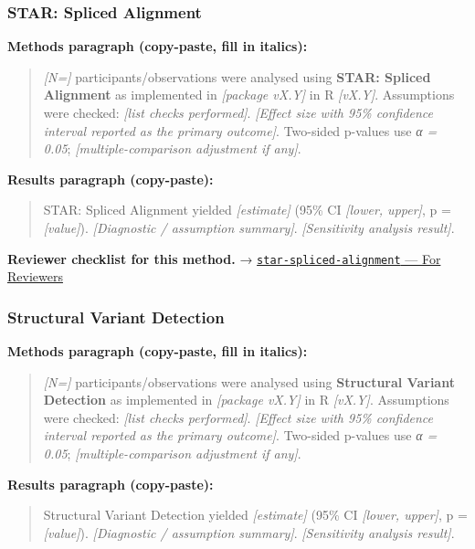 \documentclass[
]{article}
\begin{document}
\subsubsection{STAR: Spliced Alignment}\label{star-spliced-alignment}

\textbf{Methods paragraph (copy-paste, fill in italics):}

\begin{quote}
\emph{{[}N={]}} participants/observations were analysed using
\textbf{STAR: Spliced Alignment} as implemented in \emph{{[}package
vX.Y{]}} in R \emph{{[}vX.Y{]}}. Assumptions were checked: \emph{{[}list
checks performed{]}}. \emph{{[}Effect size with 95\% confidence interval
reported as the primary outcome{]}}. Two-sided p-values use \emph{α =
0.05}; \emph{{[}multiple-comparison adjustment if any{]}}.
\end{quote}

\textbf{Results paragraph (copy-paste):}

\begin{quote}
STAR: Spliced Alignment yielded \emph{{[}estimate{]}} (95\% CI
\emph{{[}lower, upper{]}}, p = \emph{{[}value{]}}). \emph{{[}Diagnostic
/ assumption summary{]}}. \emph{{[}Sensitivity analysis result{]}}.
\end{quote}

\textbf{Reviewer checklist for this method.} →
\href{../chapters/12-bioinformatics/star-spliced-alignment.Rmd\#for-reviewers}{\texttt{star-spliced-alignment}
--- For Reviewers}

\subsubsection{Structural Variant
Detection}\label{structural-variant-detection}

\textbf{Methods paragraph (copy-paste, fill in italics):}

\begin{quote}
\emph{{[}N={]}} participants/observations were analysed using
\textbf{Structural Variant Detection} as implemented in \emph{{[}package
vX.Y{]}} in R \emph{{[}vX.Y{]}}. Assumptions were checked: \emph{{[}list
checks performed{]}}. \emph{{[}Effect size with 95\% confidence interval
reported as the primary outcome{]}}. Two-sided p-values use \emph{α =
0.05}; \emph{{[}multiple-comparison adjustment if any{]}}.
\end{quote}

\textbf{Results paragraph (copy-paste):}

\begin{quote}
Structural Variant Detection yielded \emph{{[}estimate{]}} (95\% CI
\emph{{[}lower, upper{]}}, p = \emph{{[}value{]}}). \emph{{[}Diagnostic
/ assumption summary{]}}. \emph{{[}Sensitivity analysis result{]}}.
\end{quote}
\end{document}
